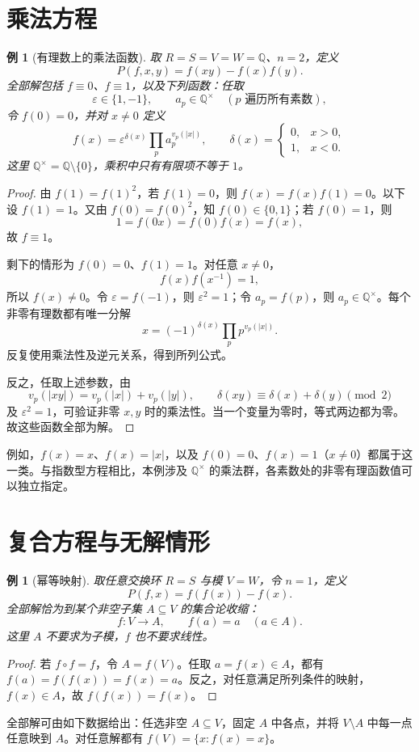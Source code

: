 \documentclass[11pt,a4paper,oneside,openany]{book}
\theoremstyle{lecture}
\newtheorem{example}[theorem]{例}
\numberwithin{equation}{section}
\begin{document}
\section{乘法方程}
\begin{example}[有理数上的乘法函数]
取 $R=S=V=W=\mathbb Q$、$n=2$，定义
\[
 P(f,x,y)=f(xy)-f(x)f(y).
\]
全部解包括 $f\equiv0$、$f\equiv1$，以及下列函数：任取
\[
 \varepsilon\in\{1,-1\},\qquad a_p\in\mathbb Q^\times\quad(p\text{ 遍历所有素数}),
\]
令 $f(0)=0$，并对 $x\ne0$ 定义
\[
 \boxed{
 f(x)=\varepsilon^{\delta(x)}\prod_{p}a_p^{v_p(|x|)},\qquad
 \delta(x)=\begin{cases}0,&x>0,\\1,&x<0.\end{cases}}
\]
这里 $\mathbb Q^\times=\mathbb Q\setminus\{0\}$，乘积中只有有限项不等于 $1$。
\end{example}
\begin{proof}
由 $f(1)=f(1)^2$，若 $f(1)=0$，则 $f(x)=f(x)f(1)=0$。以下设 $f(1)=1$。又由 $f(0)=f(0)^2$，知 $f(0)\in\{0,1\}$；若 $f(0)=1$，则
\[
 1=f(0x)=f(0)f(x)=f(x),
\]
故 $f\equiv1$。

剩下的情形为 $f(0)=0$、$f(1)=1$。对任意 $x\ne0$，
\[
 f(x)f(x^{-1})=1,
\]
所以 $f(x)\ne0$。令 $\varepsilon=f(-1)$，则 $\varepsilon^2=1$；令 $a_p=f(p)$，则 $a_p\in\mathbb Q^\times$。每个非零有理数都有唯一分解
\[
 x=(-1)^{\delta(x)}\prod_p p^{v_p(|x|)}.
\]
反复使用乘法性及逆元关系，得到所列公式。

反之，任取上述参数，由
\[
 v_p(|xy|)=v_p(|x|)+v_p(|y|),\qquad
 \delta(xy)\equiv\delta(x)+\delta(y)\pmod2
\]
及 $\varepsilon^2=1$，可验证非零 $x,y$ 时的乘法性。当一个变量为零时，等式两边都为零。故这些函数全部为解。
\end{proof}

例如，$f(x)=x$、$f(x)=|x|$，以及 $f(0)=0$、$f(x)=1$（$x\ne0$）都属于这一类。与指数型方程相比，本例涉及 $\mathbb Q^\times$ 的乘法群，各素数处的非零有理函数值可以独立指定。


\section{复合方程与无解情形}
\begin{example}[幂等映射]
取任意交换环 $R=S$ 与模 $V=W$，令 $n=1$，定义
\[
 P(f,x)=f(f(x))-f(x).
\]
全部解恰为到某个非空子集 $A\subseteq V$ 的集合论收缩：
\[
 \boxed{f:V\to A,\qquad f(a)=a\quad(a\in A).}
\]
这里 $A$ 不要求为子模，$f$ 也不要求线性。
\end{example}
\begin{proof}
若 $f\circ f=f$，令 $A=f(V)$。任取 $a=f(x)\in A$，都有 $f(a)=f(f(x))=f(x)=a$。反之，对任意满足所列条件的映射，$f(x)\in A$，故 $f(f(x))=f(x)$。
\end{proof}
全部解可由如下数据给出：任选非空 $A\subseteq V$，固定 $A$ 中各点，并将 $V\setminus A$ 中每一点任意映到 $A$。对任意解都有 $f(V)=\{x:f(x)=x\}$。
\end{document}
